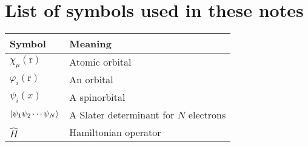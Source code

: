 \documentclass[../Main/notes.tex]{subfiles}
\begin{document}
\section*{List of symbols used in these notes}
\begin{center}
\begin{tabular}{@{} ll @{}} %
\toprule
Symbol & Meaning \\
\midrule
$\chi_\mu(\mathrm{r})$ & Atomic orbital \\
$\varphi_i(\mathrm{r})$ & An orbital \\
$\psi_i(x)$ & A spinorbital \\
$\ket{\psi_1 \psi_2 \cdots \psi_N}$ & A Slater determinant for $N$ electrons \\
$\hat{H}$ & Hamiltonian operator \\
\bottomrule
\end{tabular}
\end{center}
\end{document}
